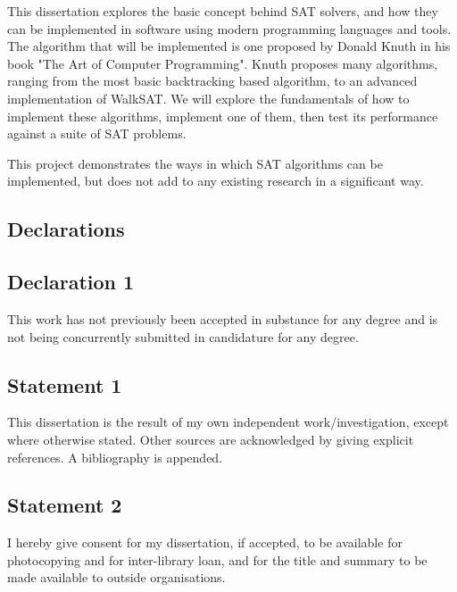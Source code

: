 \documentclass{article}
\begin{document}
This dissertation explores the basic concept behind SAT solvers, and how they can be implemented in
software using modern programming languages and tools. The algorithm that will be
implemented is one proposed by Donald Knuth in his book "The Art of Computer Programming". Knuth proposes
many algorithms, ranging from the most basic backtracking based algorithm, to an advanced
implementation of WalkSAT\cite{donald}. We will explore the fundamentals of how to implement these algorithms,
implement one of them, then test its performance against a suite of SAT problems.

This project demonstrates the ways in which SAT algorithms can be implemented, but does not add to any existing research in a
significant way.

\newpage
\thispagestyle{empty}
\begin{center}
\section*{Declarations}
\end{center}
\vspace*{\fill}
\subsection*{Declaration 1}
This work has not previously been accepted in substance for any degree and is
not being concurrently submitted in candidature for any degree.

\subsection*{Statement 1}
This dissertation is the result of my own independent work/investigation, except
where otherwise stated. Other sources are acknowledged by giving explicit
references. A bibliography is appended.

\subsection*{Statement 2}
I hereby give consent for my dissertation, if accepted, to be available for
photocopying and for inter-library loan, and for the title and summary to be
made available to outside organisations.

\vspace*{\fill}

\newpage
\thispagestyle{empty}
\tableofcontents

\newpage
\end{document}
